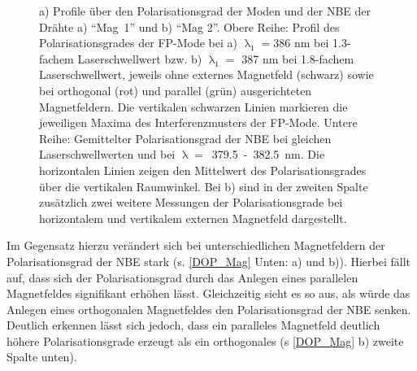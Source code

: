 \begin{figure}[b]
\caption{a) Profile über den Polarisationsgrad der Moden und der NBE der Drähte a) \mbox{``Mag 1''} und b) ``Mag 2''. Obere Reihe: Profil des Polarisationsgrades der FP-Mode bei a) $\uplambda_\text{1}=$386 nm bei 1.3-fachem Laserschwellwert bzw. b) $\uplambda_\text{1}=$ 387 nm bei 1.8-fachem Laserschwellwert, jeweils ohne externes Magnetfeld (schwarz) sowie bei orthogonal (rot) und parallel (grün) ausgerichteten Magnetfeldern. Die vertikalen schwarzen Linien markieren die jeweiligen Maxima des Interferenzmusters der FP-Mode. Untere Reihe: Gemittelter Polarisationsgrad der NBE bei gleichen Laserschwellwerten und bei \mbox{$\uplambda=$ 379.5 - 382.5 nm}. Die horizontalen Linien zeigen den Mittelwert des Polarisationsgrades über die vertikalen Raumwinkel. Bei b) sind in der zweiten Spalte zusätzlich zwei weitere Messungen der Polarisationsgrade bei horizontalem und vertikalem externen Magnetfeld dargestellt.}
\label{DOP_Mag}
\end{figure}
Im Gegensatz hierzu verändert sich bei unterschiedlichen Magnetfeldern der Polarisationsgrad der NBE stark (s. \autoref{DOP_Mag} Unten: a) und b)). Hierbei fällt auf, dass sich der Polarisationsgrad durch das Anlegen eines parallelen Magnetfeldes signifikant erhöhen lässt. Gleichzeitig sieht es so aus, als würde das Anlegen eines orthogonalen Magnetfeldes den Polarisationsgrad der NBE senken. Deutlich erkennen lässt sich jedoch, dass ein paralleles Magnetfeld deutlich höhere Polarisationsgrade erzeugt als ein orthogonales (s \autoref{DOP_Mag} b) zweite Spalte unten).\\
